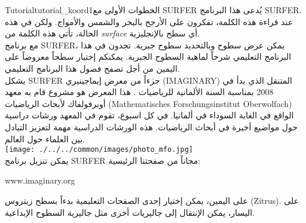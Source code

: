 \begin{surferIntroPage}{Tutorial}{tutorial_koord1}{الخطوات الأولى مع SURFER}
يُدعى هذا البرنامج SURFER. عند قراءة هذه الكلمة، تفكرون على الأرجح بالبحر والشمس والأمواج. ولكن في هذه الحالة، تأتي هذه الكلمة من {\it surface} أي سطح بالإنجليزية.
\\
مع برنامج SURFER، يمكن عرض سطوح وبالتحديد سطوح جبرية. تجدون في هذا البرنامج التعليمي شرحاً لماهية السطوح الجبرية. يمكنكم إختيار سطحاً معروضاً على اليمين من أجل تصفح فصول هذا البرنامج التعليمي.\\
يشكل SURFER جزءاً من معرض إيماجينيري
 (IMAGINARY)
  المتنقل الذي بدأ في 2008 بمناسبة السنة الألمانية للرياضيات . هذا المعرض هو مشروع قام به معهد أوبرفولفاك لأبحاث الرياضيات 
\textenglish{(Mathematisches Forschungsinstitut Oberwolfach)}
 الواقع في الغابة السوداء في ألمانيا. في كل اسبوع، تقوم في المعهد ورشات دراسية حول مواضيع أخيرة في أبحاث الرياضيات. هذه الورشات الدراسية مهمة لتعزيز التبادل بين العلماء حول العالم. \\
\vspace{0.2cm} \hspace{3.5cm}\texttt{[image: ./../../common/images/photo\_mfo.jpg]}\\
يمكن تنزيل برنامج SURFER مجاناً من صفحتنا الرئيسية: \\
\begin{centering}
www.imaginary.org\\
\end{centering}
 \vspace{0.2cm}
على اليمين، يمكن إختيار إحدى الصفحات التعليمية بدءاً بسطح زيتروس
 (Zitrus).
  على اليسار، يمكن الإنتقال إلى جاليريات أخرى مثل جاليرية السطوح الإبداعية.
\end{surferIntroPage}

